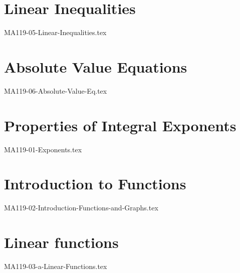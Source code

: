 \documentclass[11pt, math=mtpro2, color=blue, lang=en, mode=fancy]{CLS/elegantbookr}
\begin{document}







\newpage

\blankpage

% 




\newpage

\blankpage

\mainmatter

\renewcommand{\baselinestretch}{1.05}\normalsize

\chapter{Linear Inequalities}
{MA119-05-Linear-Inequalities.tex}
\newpage


\chapter{Absolute Value Equations}
{MA119-06-Absolute-Value-Eq.tex}
\newpage


\chapter{Properties of Integral Exponents}
{MA119-01-Exponents.tex}
\newpage


\chapter{Introduction to Functions}
{MA119-02-Introduction-Functions-and-Graphs.tex}
\newpage


\chapter{Linear functions}
{MA119-03-a-Linear-Functions.tex}
\newpage
\end{document}
